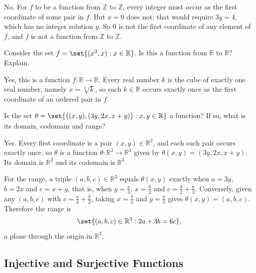 \documentclass[DIN, pagenumber=false, fontsize=11pt, parskip=half]{scrartcl}
\begin{document}
\begin{problems}
    \answer No. For $f$ to be a function from $\mathbb{Z}$ to $\mathbb{Z}$, every integer must occur as the first coordinate of some pair in $f$. But $x = 0$ does not: that would require $3y = 4$, which has no integer solution $y$. So $0$ is not the first coordinate of any element of $f$, and $f$ is not a function from $\mathbb{Z}$ to $\mathbb{Z}$.

    \problem Consider the set $f = \set{(x^3, x) : x \in \mathbb{R}}$. Is this a function from $\mathbb{R}$ to $\mathbb{R}$? Explain.

    \answer Yes, this is a function $f : \mathbb{R} \to \mathbb{R}$. Every real number $k$ is the cube of exactly one real number, namely $x = \sqrt[3]{k}$, so each $k \in \mathbb{R}$ occurs exactly once as the first coordinate of an ordered pair in $f$.

    \problem Is the set $\theta = \set{\big((x,y),(3y,2x,x+y)\big) : x,y \in \mathbb{R}}$ a function? If so, what is its domain, codomain and range?

    \answer Yes. Every first coordinate is a pair $(x,y) \in \mathbb{R}^2$, and each such pair occurs exactly once, so $\theta$ is a function $\theta : \mathbb{R}^2 \to \mathbb{R}^3$ given by $\theta(x,y) = (3y,2x,x+y)$.
    Its domain is $\mathbb{R}^2$ and its codomain is $\mathbb{R}^3$.

    For the range, a triple $(a,b,c) \in \mathbb{R}^3$ equals $\theta(x,y)$ exactly when $a = 3y$, $b = 2x$ and $c = x+y$, that is, when $y = \frac{a}{3}$, $x = \frac{b}{2}$ and $c = \frac{b}{2} + \frac{a}{3}$. Conversely, given any $(a,b,c)$ with $c = \frac{a}{3} + \frac{b}{2}$, taking $x = \frac{b}{2}$ and $y = \frac{a}{3}$ gives $\theta(x,y) = (a,b,c)$. Therefore the range is
    \[
        \set{(a,b,c) \in \mathbb{R}^3 : 2a + 3b = 6c},
    \]
    a plane through the origin in $\mathbb{R}^3$.

\end{problems}

\subsection{Injective and Surjective Functions}
\end{document}
